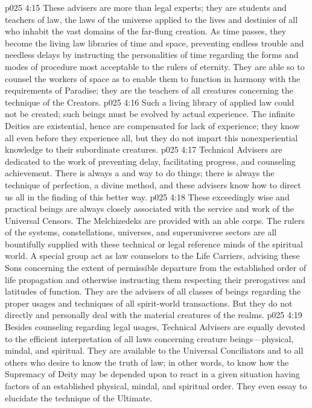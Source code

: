 \vs p025 4:15 These advisers are more than legal experts; they are students and teachers of  law, the laws of the universe applied to the lives and destinies of all who inhabit the vast domains of the far\hyp{}flung creation. As time passes, they become the living law libraries of time and space, preventing endless trouble and needless delays by instructing the personalities of time regarding the forms and modes of procedure most acceptable to the rulers of eternity. They are able so to counsel the workers of space as to enable them to function in harmony with the requirements of Paradise; they are the teachers of all creatures concerning the technique of the Creators.\plusone
\vs p025 4:16 Such a living library of applied law could not be created; such beings must be evolved by actual experience. The infinite Deities are existential, hence are compensated for lack of experience; they know all even before they experience all, but they do not impart this nonexperiential knowledge to their subordinate creatures.
\pc \vs p025 4:17 Technical Advisers are dedicated to the work of preventing delay, facilitating progress, and counseling achievement. There is always a  and  way to do things; there is always the technique of perfection, a divine method, and these advisers know how to direct us all in the finding of this better way.
\vs p025 4:18 These exceedingly wise and practical beings are always closely associated with the service and work of the Universal Censors. The Melchizedeks are provided with an able corps. The rulers of the systems, constellations, universes, and superuniverse sectors are all bountifully supplied with these technical or legal reference minds of the spiritual world. A special group act as law counselors to the Life Carriers, advising these Sons concerning the extent of permissible departure from the established order of life propagation and otherwise instructing them respecting their prerogatives and latitudes of function. They are the advisers of all classes of beings regarding the proper usages and techniques of all spirit\hyp{}world transactions. But they do not directly and personally deal with the material creatures of the realms.
\vs p025 4:19 Besides counseling regarding legal usages, Technical Advisers are equally devoted to the efficient interpretation of all laws concerning creature beings---physical, mindal, and spiritual. They are available to the Universal Conciliators and to all others who desire to know the truth of law; in other words, to know how the Supremacy of Deity may be depended upon to react in a given situation having factors of an established physical, mindal, and spiritual order. They even essay to elucidate the technique of the Ultimate.
